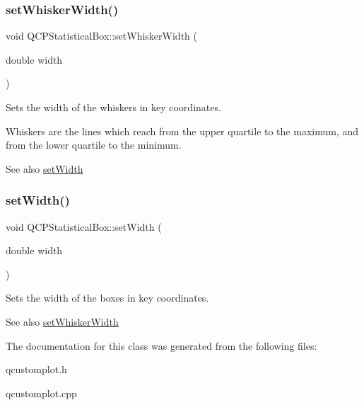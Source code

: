 \subsubsection{\texorpdfstring{set\+Whisker\+Width()}{setWhiskerWidth()}}
{\footnotesize\ttfamily void Q\+C\+P\+Statistical\+Box\+::set\+Whisker\+Width (\begin{DoxyParamCaption}\item[{double}]{width }\end{DoxyParamCaption})}

Sets the width of the whiskers in key coordinates.

Whiskers are the lines which reach from the upper quartile to the maximum, and from the lower quartile to the minimum.

\begin{DoxySeeAlso}{See also}
\hyperlink{class_q_c_p_statistical_box_a0b62775bd67301b1eba5c785f2b26f14}{set\+Width} 
\end{DoxySeeAlso}
\mbox{\label{class_q_c_p_statistical_box_a0b62775bd67301b1eba5c785f2b26f14}} 
\subsubsection{\texorpdfstring{set\+Width()}{setWidth()}}
{\footnotesize\ttfamily void Q\+C\+P\+Statistical\+Box\+::set\+Width (\begin{DoxyParamCaption}\item[{double}]{width }\end{DoxyParamCaption})}

Sets the width of the boxes in key coordinates.

\begin{DoxySeeAlso}{See also}
\hyperlink{class_q_c_p_statistical_box_adf378812446bd66f34d1f7f293d991cd}{set\+Whisker\+Width} 
\end{DoxySeeAlso}


The documentation for this class was generated from the following files\+:\begin{DoxyCompactItemize}
\item 
qcustomplot.\+h\item 
qcustomplot.\+cpp\end{DoxyCompactItemize}
